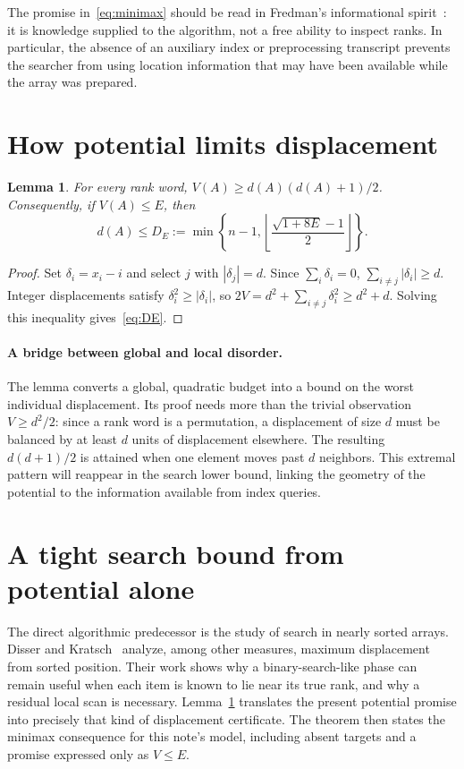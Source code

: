 \documentclass[10pt,letterpaper]{article}
\newtheorem{lemma}[theorem]{Lemma}
\begin{document}
The promise in~\eqref{eq:minimax} should be read in Fredman's informational
spirit~\cite{fredman}: it is knowledge supplied to the algorithm, not a free
ability to inspect ranks. In particular, the absence of an auxiliary index or
preprocessing transcript prevents the searcher from using location information
that may have been available while the array was prepared.

\section{How potential limits displacement}
\begin{lemma}\label{lem:displacement}
For every rank word, $V(A)\geq d(A)(d(A)+1)/2$. Consequently, if $V(A)\leq E$, then
\begin{equation}
 d(A)\leq D_E:=\min\left\{n-1,\left\lfloor\frac{\sqrt{1+8E}-1}{2}\right\rfloor\right\}.
 \label{eq:DE}
\end{equation}
\end{lemma}
\begin{proof}
Set $\delta_i=x_i-i$ and select $j$ with $|\delta_j|=d$. Since $\sum_i\delta_i=0$,
$\sum_{i\ne j}|\delta_i|\geq d$. Integer displacements satisfy $\delta_i^2\geq|\delta_i|$,
so $2V=d^2+\sum_{i\ne j}\delta_i^2\geq d^2+d$. Solving this inequality gives~\eqref{eq:DE}.
\end{proof}

\paragraph{A bridge between global and local disorder.}
The lemma converts a global, quadratic budget into a bound on the worst
individual displacement. Its proof needs more than the trivial observation
$V\geq d^2/2$: since a rank word is a permutation, a displacement of size $d$
must be balanced by at least $d$ units of displacement elsewhere. The resulting
$d(d+1)/2$ is attained when one element moves past $d$ neighbors. This
extremal pattern will reappear in the search lower bound, linking the geometry
of the potential to the information available from index queries.

\newpage
\section{A tight search bound from potential alone}
The direct algorithmic predecessor is the study of search in nearly sorted
arrays. Disser and Kratsch~\cite{disser} analyze, among other measures, maximum
displacement from sorted position. Their work shows why a binary-search-like
phase can remain useful when each item is known to lie near its true rank, and
why a residual local scan is necessary. Lemma~\ref{lem:displacement} translates
the present potential promise into precisely that kind of displacement
certificate. The theorem then states the minimax consequence for this note's
model, including absent targets and a promise expressed only as $V\leq E$.
\end{document}

